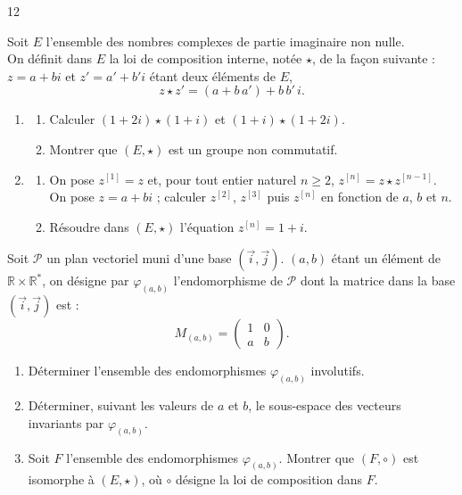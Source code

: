 \documentclass{axiobac}
\begin{document}
\begin{probleme}{12}

\horsprogramme

Soit $E$ l'ensemble des nombres complexes de partie imaginaire non nulle. \\
On définit dans $E$ la loi de composition interne, notée $\star$, de la façon suivante : $z = a + bi$ et $z' = a' + b'i$ étant deux éléments de $E$,
\[
z \star z' = (a + b\,a') + b\,b'\,i .
\]

\begin{enumerate}
    \item
    \begin{enumerate}
        \item Calculer $(1 + 2i) \star (1 + i)$ et $(1 + i) \star (1 + 2i)$.
        \item Montrer que $(E, \star)$ est un groupe non commutatif.
    \end{enumerate}
    \item
    \begin{enumerate}
        \item On pose $z^{[1]} = z$ et, pour tout entier naturel $n \geqslant 2$, $z^{[n]} = z \star z^{[n-1]}$. \\
        On pose $z = a + bi$ ; calculer $z^{[2]}$, $z^{[3]}$ puis $z^{[n]}$ en fonction de $a$, $b$ et $n$.
        \item Résoudre dans $(E, \star)$ l'équation $z^{[n]} = 1 + i$.
    \end{enumerate}
\end{enumerate}

\horsprogramme

Soit $\mathcal{P}$ un plan vectoriel muni d'une base $(\vec{i}, \vec{j})$. $(a, b)$ étant un élément de $\mathbb{R} \times \mathbb{R}^*$, on désigne par $\varphi_{(a,b)}$ l'endomorphisme de $\mathcal{P}$ dont la matrice dans la base $(\vec{i}, \vec{j})$ est :
\[
M_{(a,b)} = \begin{pmatrix} 1 & 0 \\ a & b \end{pmatrix} .
\]

\begin{enumerate}
    \item Déterminer l'ensemble des endomorphismes $\varphi_{(a,b)}$ involutifs.
    \item Déterminer, suivant les valeurs de $a$ et $b$, le sous-espace des vecteurs invariants par $\varphi_{(a,b)}$.
    \item Soit $F$ l'ensemble des endomorphismes $\varphi_{(a,b)}$. Montrer que $(F, \circ)$ est isomorphe à $(E, \star)$, où $\circ$ désigne la loi de composition dans $F$.
\end{enumerate}


\end{probleme}
\end{document}
